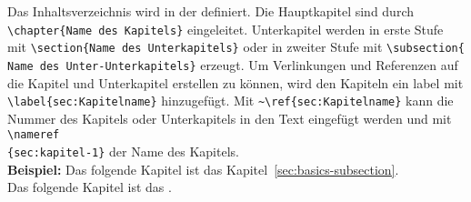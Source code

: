 Das Inhaltsverzeichnis wird in der 
definiert.
Die Hauptkapitel sind durch \lstinline|\chapter{Name des Kapitels}| eingeleitet.
Unterkapitel werden in erste Stufe mit \lstinline|\section{Name des Unterkapitels}| 
oder in zweiter Stufe mit \lstinline|\subsection{|\\\lstinline|Name des Unter-Unterkapitels}| erzeugt.
Um Verlinkungen und Referenzen auf die Kapitel und Unterkapitel erstellen zu können,
wird den Kapiteln ein label mit \lstinline|\label{sec:Kapitelname}| hinzugefügt.
Mit \lstinline|~\ref{sec:Kapitelname}| kann die Nummer des Kapitels oder Unterkapitels
in den Text eingefügt werden und mit \lstinline|\nameref|\\\lstinline|{sec:kapitel-1}| 
der Name des Kapitels.\\
\textbf{Beispiel:}
Das folgende Kapitel ist das Kapitel~\ref{sec:basics-subsection}.\\
Das folgende Kapitel ist das .\\

